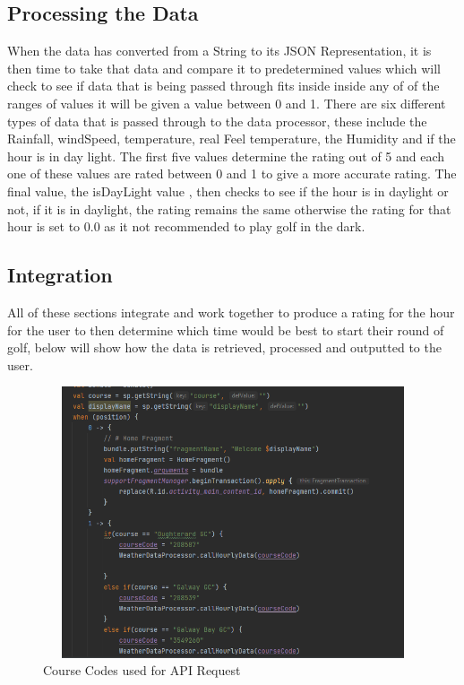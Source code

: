 \subsection {Processing the Data}
When the data has converted from a String to its JSON Representation, it is then time to take that data and compare it to predetermined values which will check to see if data that is being passed through fits inside inside any of of the ranges of values it will be given a value between 0 and 1.
\newline
\newline
There are six different types of data that is passed through to the data processor, these include the Rainfall, windSpeed, temperature, real Feel temperature, the Humidity and if the hour is in day light. The first five values determine the rating out of 5 and each one of these values are rated between 0 and 1 to give a more accurate rating. The final value, the isDayLight value , then checks to see if the hour is in daylight or not, if it is in daylight, the rating remains the same otherwise the rating for that hour is set to 0.0 as it not recommended to play golf in the dark.
\subsection{Integration}

All of these sections integrate and work together to produce a rating for the hour for the user to then determine which time would be best to start their round of golf, below will show how the data is retrieved, processed and outputted to the user.
\begin{figure}[H]
    \centering
    \includegraphics[width=12cm,height = 8cm]{img/CourseCodes.PNG}
    \caption{Course Codes used for API Request}
    \label{fig:altas config}
\end{figure}

